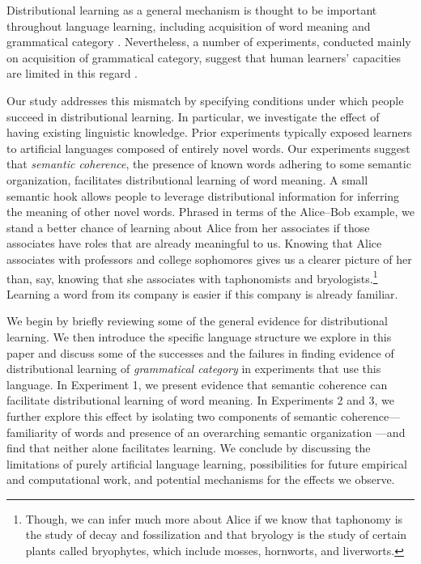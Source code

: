 \documentclass[man,floatsintext]{apa6}
\begin{document}
Distributional learning as a general mechanism is thought to be important throughout language learning, including acquisition of word meaning \citep{landauer1997} and grammatical category \citep{redington1998}. Nevertheless, a number of experiments, conducted mainly on acquisition of grammatical category, suggest that human learners' capacities are limited in this regard \citep{braine1987, brooks1993, frigo1998, kempe2001, gerken2005, frank2011}.

Our study addresses this mismatch by specifying conditions under which people succeed in distributional learning. In particular, we investigate the effect of having existing linguistic knowledge. Prior experiments typically exposed learners to artificial languages composed of entirely novel words. Our experiments suggest that \emph{semantic coherence}, the presence of known words adhering to some semantic organization, facilitates distributional learning of word meaning. A small semantic hook allows people to leverage distributional information for inferring the meaning of other novel words. Phrased in terms of the Alice--Bob example, we stand a better chance of learning about Alice from her associates if those associates have roles that are already meaningful to us. Knowing that Alice associates with professors and college sophomores gives us a clearer picture of her than, say, knowing that she associates with taphonomists and bryologists.\footnote{Though, we can infer much more about Alice if we know that taphonomy is the study of decay and fossilization and that bryology is the study of certain plants called bryophytes, which include mosses, hornworts, and liverworts.} Learning a word from its company is easier if this company is already familiar. 

We begin by briefly reviewing some of the general evidence for distributional learning. We then introduce the specific language structure we explore in this paper and discuss some of the successes and the failures in finding evidence of distributional learning of \emph{grammatical category} in experiments that use this language. In Experiment 1, we present evidence that semantic coherence can facilitate distributional learning of word meaning. In Experiments 2 and 3, we further explore this effect by isolating two components of semantic coherence---familiarity of words and presence of an overarching semantic organization ---and find that neither alone facilitates learning. We conclude by discussing the limitations of purely artificial language learning, possibilities for future empirical and computational work, and potential mechanisms for the effects we observe.
 
\end{document}

